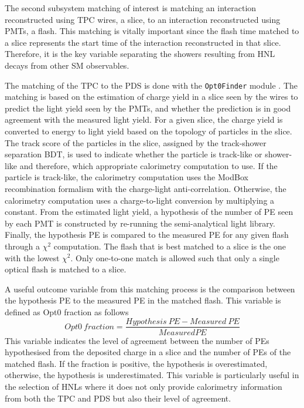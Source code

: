 The second subsystem matching of interest is matching an interaction reconstructed using TPC wires, 
a slice, to an interaction reconstructed using PMTs, a flash.                                        
This matching is vitally important since the flash time matched to a slice represents the start time of the interaction reconstructed in that slice.
Therefore, it is the key variable separating the showers resulting from HNL decays from other SM observables.

The matching of the TPC to the PDS is done with the \texttt{Opt0Finder} module \cite{opt0finder_module}.
The matching is based on the estimation of charge yield in a slice seen by the wires to predict the light yield seen by the PMTs, and whether the prediction is in good agreement with the measured light yield.
For a given slice, the charge yield is converted to energy to light yield based on the topology of particles in the slice.
The track score of the particles in the slice, assigned by the track-shower separation BDT, is used to indicate whether the particle is track-like or shower-like and therefore, which appropriate calorimetry computation to use.
If the particle is track-like, the calorimetry computation uses the ModBox recombination formalism with 
the charge-light anti-correlation. 
Otherwise, the calorimetry computation uses a charge-to-light conversion by multiplying a constant.     
From the estimated light yield, a hypothesis of the number of PE seen by each PMT is constructed by re-running the semi-analytical light library.
Finally, the hypothesis PE is compared to the measured PE for any given flash through a $\chi^2$ computation.
The flash that is best matched to a slice is the one with the lowest $\chi^2$.
Only one-to-one match is allowed such that only a single optical flash is matched to a slice.

A useful outcome variable from this matching process is the comparison between the hypothesis PE to the measured PE in the matched flash.
This variable is defined as Opt0 fraction as follows
\begin{equation}
\label{eq:opt0fraction}
Opt\textit{0}\ fraction = \frac{Hypothesis\ PE - Measured\ PE}{Measured PE}
\end{equation}
This variable indicates the level of agreement between the number of PEs hypothesised from the deposited charge in a slice and the number of PEs of the matched flash.
If the fraction is positive, the hypothesis is overestimated, otherwise, the hypothesis is underestimated.
This variable is particularly useful in the selection of HNLs where it does not only provide calorimetry information from both the TPC and PDS but also their level of agreement.


